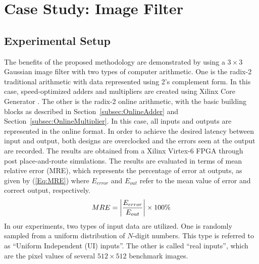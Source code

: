\documentclass{acm_proc_article-sp}
\begin{document}
\section{Case Study: Image Filter}\label{Sec:CaseStudy}
\subsection{Experimental Setup}
The benefits of the proposed methodology are demonstrated by using a $3\times3$ Gaussian image filter with two types of computer arithmetic. One is the radix-2 traditional arithmetic with data represented using 2's complement form. In this case, speed-optimized adders and multipliers are created using Xilinx Core Generator \cite{XilinxMult}. The other is the radix-2 online arithmetic, with the basic building blocks as described in Section~\ref{subsec:OnlineAdder} and Section~\ref{subsec:OnlineMultiplier}. In this case, all inputs and outputs are represented in the online format. In order to achieve the desired latency between input and output, both designs are overclocked and the errors seen at the output are recorded. The results are obtained from a Xilinx Virtex-6 FPGA through post place-and-route simulations. The results are evaluated in terms of mean relative error (MRE), which represents the percentage of error at outputs, as given by (\ref{Eq:MRE}) where $E_{error}$ and $E_{out}$ refer to the mean value of error and correct output, respectively.
%
\begin{eqnarray}\label{Eq:MRE}
\scriptsize
  MRE=\left|\frac{E_{error}}{E_{out}}\right|\times100\%
\end{eqnarray}
\normalsize
%
In our experiments, two types of input data are utilized. One is randomly sampled from a uniform distribution of $N$-digit numbers. This type is referred to as ``Uniform Independent (UI) inputs''. The other is called ``real inputs'', which are the pixel values of several $512\times512$ benchmark images.

\vspace{-1ex}
\end{document}
